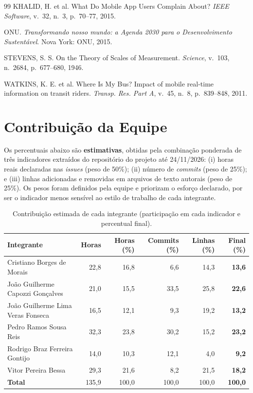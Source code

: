 \documentclass[11pt,a4paper]{article}
\begin{document}
\begin{thebibliography}{99}
KHALID, H. et al. What Do Mobile App Users Complain About? \emph{IEEE Software}, v.~32, n.~3, p.~70--77, 2015.

ONU. \emph{Transformando nosso mundo: a Agenda 2030 para o Desenvolvimento Sustentável}. Nova York: ONU, 2015.

STEVENS, S. S. On the Theory of Scales of Measurement. \emph{Science}, v.~103, n.~2684, p.~677--680, 1946.

WATKINS, K. E. et al. Where Is My Bus? Impact of mobile real-time information on transit riders. \emph{Transp. Res. Part A}, v.~45, n.~8, p.~839--848, 2011.

\end{thebibliography}

\appendix
\section{Contribuição da Equipe}
\label{ap:contribuicao}

Os percentuais abaixo são \textbf{estimativas}, obtidas pela combinação ponderada de três indicadores extraídos do repositório do projeto até 24/11/2026: (i) horas reais declaradas nas \textit{issues} (peso de 50\%); (ii) número de \textit{commits} (peso de 25\%); e (iii) linhas adicionadas e removidas em arquivos de texto autorais (peso de 25\%). Os pesos foram definidos pela equipe e priorizam o esforço declarado, por ser o indicador menos sensível ao estilo de trabalho de cada integrante.

\begin{table}[H]
\centering
\caption{Contribuição estimada de cada integrante (participação em cada indicador e percentual final).}
\label{tab:contribuicao}
\small
\begin{tabularx}{\linewidth}{Xrrrrr}
\toprule
\textbf{Integrante} & \textbf{Horas} & \textbf{Horas (\%)} & \textbf{Commits (\%)} & \textbf{Linhas (\%)} & \textbf{Final (\%)} \\
\midrule
Cristiano Borges de Morais & 22,8 & 16,8 & 6,6 & 14,3 & \textbf{13,6} \\
João Guilherme Capozzi Gonçalves & 21,0 & 15,5 & 33,5 & 25,8 & \textbf{22,6} \\
João Guilherme Lima Veras Fonseca & 16,5 & 12,1 & 9,3 & 19,2 & \textbf{13,2} \\
Pedro Ramos Sousa Reis & 32,3 & 23,8 & 30,2 & 15,2 & \textbf{23,2} \\
Rodrigo Braz Ferreira Gontijo & 14,0 & 10,3 & 12,1 & 4,0 & \textbf{9,2} \\
Vitor Pereira Bessa & 29,3 & 21,6 & 8,2 & 21,5 & \textbf{18,2} \\
\midrule
\textbf{Total} & 135,9 & 100,0 & 100,0 & 100,0 & \textbf{100,0} \\
\bottomrule
\end{tabularx}
\end{table}
\end{document}
